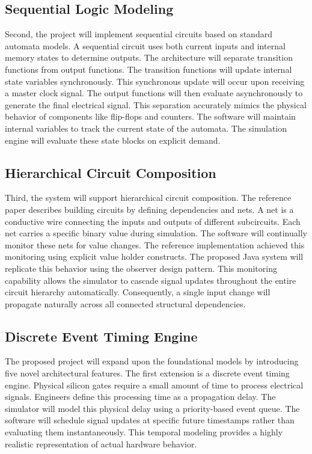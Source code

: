 \documentclass[12pt, a4paper]{article}
\begin{document}
\subsection{Sequential Logic Modeling}
Second, the project will implement sequential circuits based on standard automata models. A sequential circuit uses both current inputs and internal memory states to determine outputs. The architecture will separate transition functions from output functions. The transition functions will update internal state variables synchronously. This synchronous update will occur upon receiving a master clock signal. The output functions will then evaluate asynchronously to generate the final electrical signal. This separation accurately mimics the physical behavior of components like flip-flops and counters. The software will maintain internal variables to track the current state of the automata. The simulation engine will evaluate these state blocks on explicit demand.

\subsection{Hierarchical Circuit Composition}
Third, the system will support hierarchical circuit composition. The reference paper describes building circuits by defining dependencies and nets. A net is a conductive wire connecting the inputs and outputs of different subcircuits. Each net carries a specific binary value during simulation. The software will continually monitor these nets for value changes. The reference implementation achieved this monitoring using explicit value holder constructs. The proposed Java system will replicate this behavior using the observer design pattern. This monitoring capability allows the simulator to cascade signal updates throughout the entire circuit hierarchy automatically. Consequently, a single input change will propagate naturally across all connected structural dependencies.

\subsection{Discrete Event Timing Engine}
The proposed project will expand upon the foundational models by introducing five novel architectural features. The first extension is a discrete event timing engine. Physical silicon gates require a small amount of time to process electrical signals. Engineers define this processing time as a propagation delay. The simulator will model this physical delay using a priority-based event queue. The software will schedule signal updates at specific future timestamps rather than evaluating them instantaneously. This temporal modeling provides a highly realistic representation of actual hardware behavior.
\end{document}
